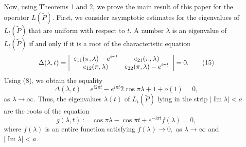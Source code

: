 \documentclass{article}%
\begin{document}
Now, using Theorems 1 and 2, we prove the main result of this paper for the
operator $L\left(  \widetilde{P}\right)  $. First, we consider asymptotic
estimates for the eigenvalues of $L_{t}\left(  \widetilde{P}\right)  \ $that
are uniform with respect to $t$. A number $\lambda$ is an eigenvalue of
$L_{t}\left(  \widetilde{P}\right)  $ if and only if it is a root of the
characteristic equation
\begin{equation}
\Delta(\lambda,t)=\left\vert
\begin{array}
[c]{cc}%
e_{11}(\pi,\lambda)-e^{i\pi t} & e_{21}(\pi,\lambda)\\
e_{12}(\pi,\lambda) & e_{22}(\pi,\lambda)-e^{i\pi t}%
\end{array}
\right\vert =0. \tag{15}%
\end{equation}
Using (8), we obtain the equality
\begin{equation}
\Delta(\lambda,t)=e^{i2\pi t}-e^{i\pi t}2\cos\pi\lambda+1+o(1)=0, \tag{16}%
\end{equation}
as $\lambda\rightarrow\infty.$ Thus, the eigenvalues $\lambda(t)$ of
$L_{t}\left(  \widetilde{P}\right)  $ lying in the strip $\left\vert
\operatorname{Im}\lambda\right\vert <a$ are the roots of the equation%
\begin{equation}
g(\lambda,t):=\cos\pi\lambda-\cos\pi t+e^{-i\pi t}f(\lambda)=0, \tag{17}%
\end{equation}
where $f(\lambda)$ is an entire function satisfying $f(\lambda)\rightarrow0,$
as $\lambda\rightarrow\infty$ and $\left\vert \operatorname{Im}\lambda
\right\vert <a.$
\end{document}
